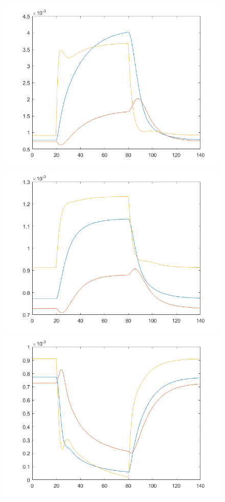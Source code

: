 \begin{figure}[h!]
\includegraphics[scale=0.3]{../c1.png}\\
\includegraphics[scale=0.3]{../a2.png}\hspace{0.01cm}
\includegraphics[scale=0.3]{../b2.png}\hspace{0.01cm}

\end{figure}

